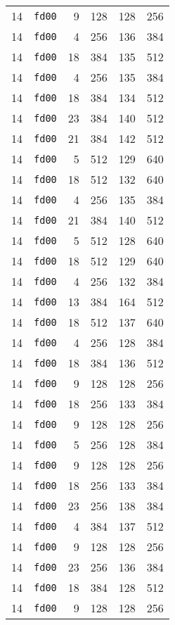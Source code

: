 \documentclass{article}
\begin{document}
\begin{table}[h!]
\begin{tabular}{llrrrl}
    14 & \texttt{fd00} & 9 & 128 & 128 & 256 \\
    14 & \texttt{fd00} & 4 & 256 & 136 & 384 \\
    14 & \texttt{fd00} & 18 & 384 & 135 & 512 \\
    14 & \texttt{fd00} & 4 & 256 & 135 & 384 \\
    14 & \texttt{fd00} & 18 & 384 & 134 & 512 \\
    14 & \texttt{fd00} & 23 & 384 & 140 & 512 \\
    14 & \texttt{fd00} & 21 & 384 & 142 & 512 \\
    14 & \texttt{fd00} & 5 & 512 & 129 & 640 \\
    14 & \texttt{fd00} & 18 & 512 & 132 & 640 \\
    14 & \texttt{fd00} & 4 & 256 & 135 & 384 \\
    14 & \texttt{fd00} & 21 & 384 & 140 & 512 \\
    14 & \texttt{fd00} & 5 & 512 & 128 & 640 \\
    14 & \texttt{fd00} & 18 & 512 & 129 & 640 \\
    14 & \texttt{fd00} & 4 & 256 & 132 & 384 \\
    14 & \texttt{fd00} & 13 & 384 & 164 & 512 \\
    14 & \texttt{fd00} & 18 & 512 & 137 & 640 \\
    14 & \texttt{fd00} & 4 & 256 & 128 & 384 \\
    14 & \texttt{fd00} & 18 & 384 & 136 & 512 \\
    14 & \texttt{fd00} & 9 & 128 & 128 & 256 \\
    14 & \texttt{fd00} & 18 & 256 & 133 & 384 \\
    14 & \texttt{fd00} & 9 & 128 & 128 & 256 \\
    14 & \texttt{fd00} & 5 & 256 & 128 & 384 \\
    14 & \texttt{fd00} & 9 & 128 & 128 & 256 \\
    14 & \texttt{fd00} & 18 & 256 & 133 & 384 \\
    14 & \texttt{fd00} & 23 & 256 & 138 & 384 \\
    14 & \texttt{fd00} & 4 & 384 & 137 & 512 \\
    14 & \texttt{fd00} & 9 & 128 & 128 & 256 \\
    14 & \texttt{fd00} & 23 & 256 & 136 & 384 \\
    14 & \texttt{fd00} & 18 & 384 & 128 & 512 \\
    14 & \texttt{fd00} & 9 & 128 & 128 & 256 \\

\end{tabular}
\end{table}
\end{document}
